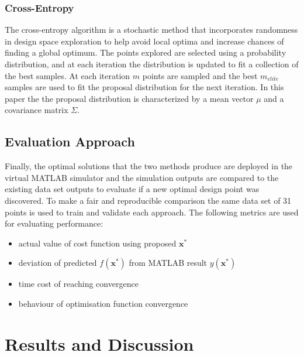 \documentclass[conf]{new-aiaa}
\begin{document}
\subsubsection{Cross-Entropy}
The cross-entropy algorithm is a stochastic method that incorporates  randomness in design space exploration to help avoid local optima and increase chances of finding a global optimum\cite{rubinstein2004cross}. The points explored are selected using a probability distribution, and at each iteration the distribution is updated to fit a collection of the best samples\cite{kochenderfer2019algorithms}. At each iteration $m$ points are sampled and the best $m_{elite}$ samples are used to fit the proposal distribution for the next iteration. In this paper the the proposal distribution is characterized by a mean vector $\mu$ and a covariance matrix $\Sigma$.

\subsection{Evaluation Approach}
Finally, the optimal solutions that the two methods produce are deployed in the virtual MATLAB simulator and the simulation outputs are compared to the existing data set outputs to evaluate if a new optimal design point was discovered. To make a fair and reproducible comparison the same data set of 31 points is used to train and validate each approach. The following metrics are used for evaluating performance:
\begin{itemize}
\item actual value of cost function using proposed $\textbf{x}^*$
\item deviation of predicted $f(\textbf{x}^*)$ from MATLAB result $y(\textbf{x}^*)$
\item time cost of reaching convergence
\item behaviour of optimisation function convergence
\end{itemize}

\section{Results and Discussion}
\end{document}
